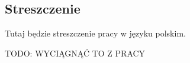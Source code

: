
\vspace*{2cm}
\begin{addmargin}[1em]{1em}%
\hspace{8mm}
\begin{center}
\subsection*{Streszczenie}
\end{center}
Tutaj będzie streszczenie pracy w języku polskim. 

TODO: WYCIĄGNĄĆ TO Z PRACY
\end{addmargin}
\vspace{2cm}
\clearpage